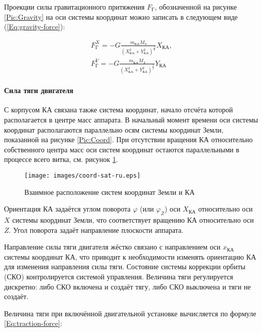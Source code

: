 \documentclass[12pt,a4paper]{article}
\begin{document}
Проекции силы гравитационного притяжения $F_{\text{Г}}$, обозначенной на рисунке
\ref{Pic:Gravity} на оси системы координат можно записать в следующем виде
(\ref{Eq:gravity-force}):

\begin{eqnarray}
  F_{\text{Г}}^X = - G \frac{m_{\text{КА}} M_{\text{З}}}{\left(X_{\text{КА}}^2 +
    Y_{\text{КА}}^2\right)^{\frac{3}{2}}} X_{\text{КА}}, \nonumber \\
  F_{\text{Г}}^Y = - G \frac{m_{\text{КА}} M_{\text{З}}}{\left(X_{\text{КА}}^2 +
    Y_{\text{КА}}^2\right)^{\frac{3}{2}}} Y_{\text{КА}} \label{Eq:gravity-force}
\end{eqnarray}

\paragraph{Сила тяги двигателя} 

С корпусом КА связана также система координат, начало отсчёта которой располагается в
центре масс аппарата. В начальный момент времени оси системы координат располагаются
параллельно осям системы координат Земли, показанной на рисунке \ref{Pic:Coord}. При
отсутствии вращения КА относительно собственного центра масс оси систем координат остаются
параллельными в процессе всего витка, см. рисунок \ref{Pic:Coord-Sat}.

\begin{figure}[tbh]
  \begin{center}
    \texttt{[image: images/coord-sat-ru.eps]}
    \caption{Взаимное расположение систем координат Земли и КА}
    \label{Pic:Coord-Sat}
  \end{center}
\end{figure}

Ориентация КА задаётся углом поворота $\varphi$ (или $\varphi_Z$) оси $X_{\text{КА}}$ относительно оси $X$ системы координат
Земли, что соответствует вращению КА относительно оси $Z$. Угол поворота задаёт направление
плоскости аппарата.

Направление силы тяги двигателя жёстко связано с направлением оси $x_{\text{КА}}$ системы
координат КА, что приводит к необходимости изменять ориентацию КА для изменения
направления силы тяги. Состояние системы коррекции орбиты (СКО) контролируется системой
управления. Величина тяги регулируется дискретно: либо СКО включена и создаёт тягу, либо
СКО выключена и тяги не создаёт.

Величина тяги при включённой двигательной установке вычисляется по формуле
\ref{Eq:traction-force}:
\end{document}

